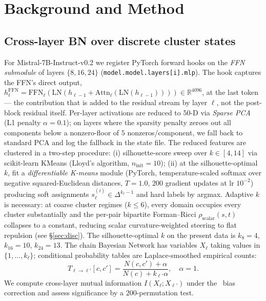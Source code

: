 \documentclass[10pt,twocolumn]{article}
\begin{document}
\section{Background and Method}
\label{sec:method}

\subsection{Cross-layer BN over discrete cluster states}
\label{sec:method-bn}

For Mistral-7B-Instruct-v0.2 we register PyTorch forward hooks on the \emph{FFN submodule} of layers $\{8,16,24\}$ (\texttt{model.model.layers[i].mlp}). The hook captures the FFN's direct output, $h_\ell^{\text{FFN}}{=}\text{FFN}_\ell(\text{LN}(h_{\ell-1}{+}\text{Attn}_\ell(\text{LN}(h_{\ell-1}))))\in\mathbb{R}^{4096}$, at the last token --- the contribution that is added to the residual stream by layer $\ell$, not the post-block residual itself. Per-layer activations are reduced to $50$-D via \emph{Sparse PCA} (L1 penalty $\alpha{=}0.1$); on layers where the sparsity penalty zeroes out all components below a nonzero-floor of $5$ nonzeros/component, we fall back to standard PCA and log the fallback in the state file. The reduced features are clustered in a two-step procedure: (i) silhouette-score sweep over $k\in[4,14]$ via scikit-learn KMeans (Lloyd's algorithm, $n_{\text{init}}{=}10$); (ii) at the silhouette-optimal $k$, fit a \emph{differentiable K-means} module (PyTorch, temperature-scaled softmax over negative squared-Euclidean distances, $T{=}1.0$, $200$ gradient updates at lr $10^{-2}$) producing soft assignments $s^{(i)}_\ell\in\Delta^{k_\ell{-}1}$ and hard labels by argmax. Adaptive $k$ is necessary: at coarse cluster regimes ($k{\leq}6$), every domain occupies every cluster substantially and the per-pair bipartite Forman--Ricci $\rho_{\text{scalar}}(s,t)$ collapses to a constant, reducing scalar curvature-weighted steering to flat repulsion (see \S\ref{sec:disc}). The silhouette-optimal $k$ on the present data is $k_8{=}4$, $k_{16}{=}10$, $k_{24}{=}13$. The chain Bayesian Network has variables $X_\ell$ taking values in $\{1,\ldots,k_\ell\}$; conditional probability tables are Laplace-smoothed empirical counts:
\begin{equation}
T_{\ell\to\ell'}[c,c'] = \frac{N(c,c')+\alpha}{N(c)+k_{\ell'}\alpha}, \quad \alpha=1.
\label{eq:cpt}
\end{equation}
We compute cross-layer mutual information $I(X_\ell;X_{\ell'})$ under the~\citet{kraskov2004estimating} bias correction and assess significance by a $200$-permutation test.
\end{document}
